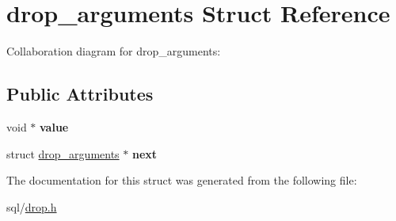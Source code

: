 \hypertarget{structdrop__arguments}{\section{drop\+\_\+arguments Struct Reference}
\label{structdrop__arguments}
}


Collaboration diagram for drop\+\_\+arguments\+:
\subsection*{Public Attributes}
\begin{DoxyCompactItemize}
\item 
\hypertarget{structdrop__arguments_a83524221500748a3fbee93a486ffabba}{void $\ast$ {\bfseries value}}\label{structdrop__arguments_a83524221500748a3fbee93a486ffabba}

\item 
\hypertarget{structdrop__arguments_a4375506674ae5bda2167689436c3ed47}{struct \hyperlink{structdrop__arguments}{drop\+\_\+arguments} $\ast$ {\bfseries next}}\label{structdrop__arguments_a4375506674ae5bda2167689436c3ed47}

\end{DoxyCompactItemize}


The documentation for this struct was generated from the following file\+:\begin{DoxyCompactItemize}
\item 
sql/\hyperlink{drop_8h}{drop.\+h}\end{DoxyCompactItemize}
